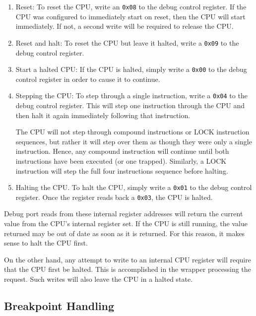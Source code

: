 \documentclass{gqtekspec}
\begin{document}
\begin{enumerate}
\item Reset: To reset the CPU, write an {\tt 0x08} to the debug control
	register.  If the CPU was configured to immediately start on reset,
	then the CPU will start immediately.  If not, a second write will
	be required to release the CPU.

\item Reset and halt: To reset the CPU but leave it halted, write a
	{\tt 0x09} to the debug control register.

\item Start a halted CPU: If the CPU is halted, simply write a {\tt 0x00}
	to the debug control register in order to cause it to continue.

\item Stepping the CPU: To step through a single instruction, write a
	{\tt 0x04} to the debug control register.  This will step one
	instruction through the CPU and then halt it again immediately
	following that instruction.

	The CPU will not step through compound instructions or LOCK
	instruction sequences, but rather it will step over them as though
	they were only a single instruction.  Hence, any compound instruction
	will continue until both instructions have been executed (or one
	trapped).  Similarly, a LOCK instruction will step the full four
	instructions sequence before halting.

\item Halting the CPU.  To halt the CPU, simply write a {\tt 0x01} to the
	debug control register.  Once the register reads back a {\tt 0x03}, the
	CPU is halted.

\end{enumerate}

Debug port reads from these internal register addresses will return the
current value from the CPU's internal register set.  If the CPU is still
running, the value returned may be out of date as soon as it is returned.
For this reason, it makes sense to halt the CPU first.

On the other hand, any attempt to write to an internal CPU register will
require that the CPU first be halted.  This is accomplished in the wrapper
processing the request.  Such writes will also leave the CPU in a halted
state.

\subsection{Breakpoint Handling}
\end{document}

